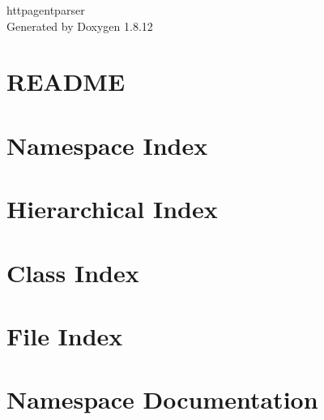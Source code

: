 \documentclass[twoside]{book}
\newcommand{\+}{\discretionary{\mbox{\scriptsize$\hookleftarrow$}}{}{}}
\newcommand{\clearemptydoublepage}{%
  \newpage{\pagestyle{empty}\cleardoublepage}%
}
\begin{document}
\hypersetup{pageanchor=false,
             bookmarksnumbered=true,
             pdfencoding=unicode
            }
\begin{titlepage}
\vspace*{7cm}
\begin{center}%
{\Large httpagentparser }\\
\vspace*{1cm}
{\large Generated by Doxygen 1.8.12}\\
\end{center}
\end{titlepage}
\clearemptydoublepage
{}
\tableofcontents
\clearemptydoublepage
{}
\hypersetup{pageanchor=true}

\chapter{R\+E\+A\+D\+ME}
\label{md__c_1__users_petertix__desktop__i_m_l__s_d_l_questionable_python_httpagentparser__r_e_a_d_m_e}
\hypertarget{md__c_1__users_petertix__desktop__i_m_l__s_d_l_questionable_python_httpagentparser__r_e_a_d_m_e}{}

\chapter{Namespace Index}

\chapter{Hierarchical Index}

\chapter{Class Index}

\chapter{File Index}

\chapter{Namespace Documentation}




\end{document}
